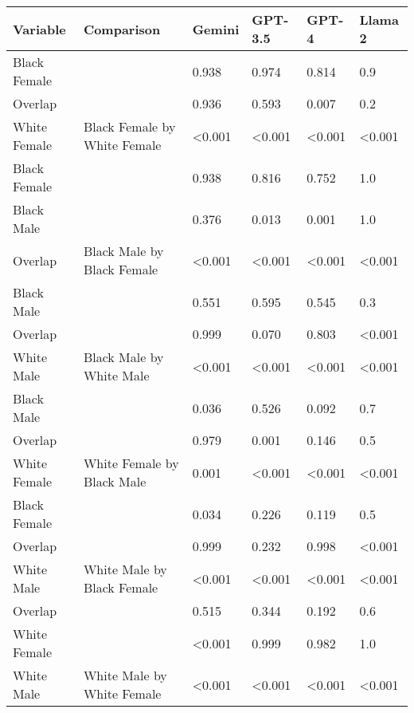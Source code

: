 
\begin{tabular}{llllll}
\toprule
Variable & Comparison & Gemini & GPT-3.5 & GPT-4 & Llama 2\\
\midrule
Black Female &  & 0.938 & 0.974 & 0.814 & 0.9\\

Overlap &  & 0.936 & 0.593 & 0.007 & 0.2\\

White Female & \multirow{-3}{*}{\raggedright\arraybackslash Black Female by White Female} & <0.001 & <0.001 & <0.001 & <0.001\\
\cmidrule{1-6}
Black Female &  & 0.938 & 0.816 & 0.752 & 1.0\\

Black Male &  & 0.376 & 0.013 & 0.001 & 1.0\\

Overlap & \multirow{-3}{*}{\raggedright\arraybackslash Black Male by Black Female} & <0.001 & <0.001 & <0.001 & <0.001\\
\cmidrule{1-6}
Black Male &  & 0.551 & 0.595 & 0.545 & 0.3\\

Overlap &  & 0.999 & 0.070 & 0.803 & <0.001\\

White Male & \multirow{-3}{*}{\raggedright\arraybackslash Black Male by White Male} & <0.001 & <0.001 & <0.001 & <0.001\\
\cmidrule{1-6}
Black Male &  & 0.036 & 0.526 & 0.092 & 0.7\\

Overlap &  & 0.979 & 0.001 & 0.146 & 0.5\\

White Female & \multirow{-3}{*}{\raggedright\arraybackslash White Female by Black Male} & 0.001 & <0.001 & <0.001 & <0.001\\
\cmidrule{1-6}
Black Female &  & 0.034 & 0.226 & 0.119 & 0.5\\

Overlap &  & 0.999 & 0.232 & 0.998 & <0.001\\

White Male & \multirow{-3}{*}{\raggedright\arraybackslash White Male by Black Female} & <0.001 & <0.001 & <0.001 & <0.001\\
\cmidrule{1-6}
Overlap &  & 0.515 & 0.344 & 0.192 & 0.6\\

White Female &  & <0.001 & 0.999 & 0.982 & 1.0\\

White Male & \multirow{-3}{*}{\raggedright\arraybackslash White Male by White Female} & <0.001 & <0.001 & <0.001 & <0.001\\
\bottomrule
\end{tabular}
